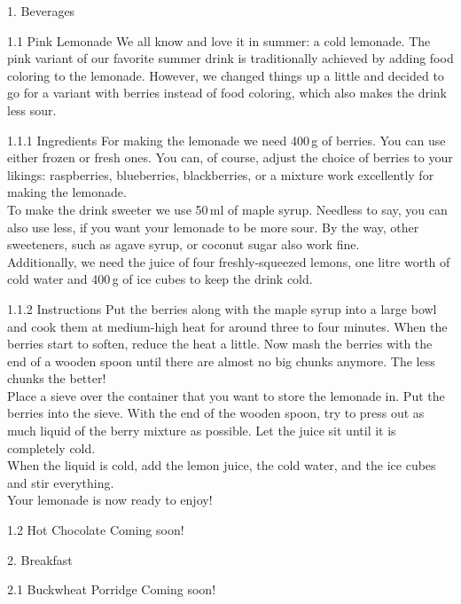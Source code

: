 
	1. Beverages
	
	1.1 Pink Lemonade
	We all know and love it in summer: a cold lemonade. The pink variant of our favorite summer drink is traditionally achieved by adding food coloring to the lemonade. However, we changed things up a little and decided to go for a variant with berries instead of food coloring, which also makes the drink less sour.
	
	1.1.1 Ingredients
	For making the lemonade we need 400\,g of berries. You can use either frozen or fresh ones. You can, of course, adjust the choice of berries to your likings: raspberries, blueberries, blackberries, or a mixture work excellently for making the lemonade. \\
	To make the drink sweeter we use 50\,ml of maple syrup. Needless to say, you can also use less, if you want your lemonade to be more sour. By the way, other sweeteners, such as agave syrup, or coconut sugar also work fine. \\ 
	Additionally, we need the juice of four freshly-squeezed lemons, one litre worth of cold water and 400\,g of ice cubes to keep the drink cold.
	
	1.1.2 Instructions
	Put the berries along with the maple syrup into a large bowl and cook them at medium-high heat for around three to four minutes. When the berries start to soften, reduce the heat a little. Now mash the berries with the end of a wooden spoon until there are almost no big chunks anymore. The less chunks the better! \\
	Place a sieve over the container that you want to store the lemonade in. Put the berries into the sieve. With the end of the wooden spoon, try to press out as much liquid of the berry mixture as possible. Let the juice sit until it is completely cold. \\
	When the liquid is cold, add the lemon juice, the cold water, and the ice cubes and stir everything. \\
	Your lemonade is now ready to enjoy!
	
	1.2 Hot Chocolate
	Coming soon!
	
	2. Breakfast 
	
	2.1 Buckwheat Porridge
	Coming soon!
	